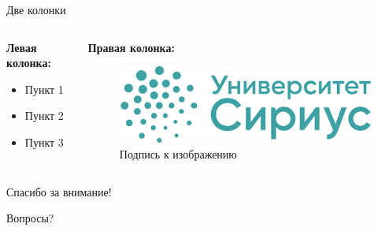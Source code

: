 \documentclass[10pt]{beamer}  %
\begin{document}
\begin{frame}{Две колонки}
    \begin{columns}
        \begin{column}{0.48\textwidth}
            \textbf{Левая колонка:}
            \begin{itemize}
                \item Пункт 1
                \item Пункт 2
                \item Пункт 3
            \end{itemize}
        \end{column}
        \begin{column}{0.48\textwidth}
            \textbf{Правая колонка:}
            \begin{figure}
                \centering
                \includegraphics[width=\linewidth]{images/Sirius-logo.png}
                \caption{Подпись к изображению}
            \end{figure}
        \end{column}
    \end{columns}
\end{frame}

\begin{frame}
    \centering
    \LARGE Спасибо за внимание!
    
    \vspace{1em}
    
    \large Вопросы?
\end{frame}
\end{document}
